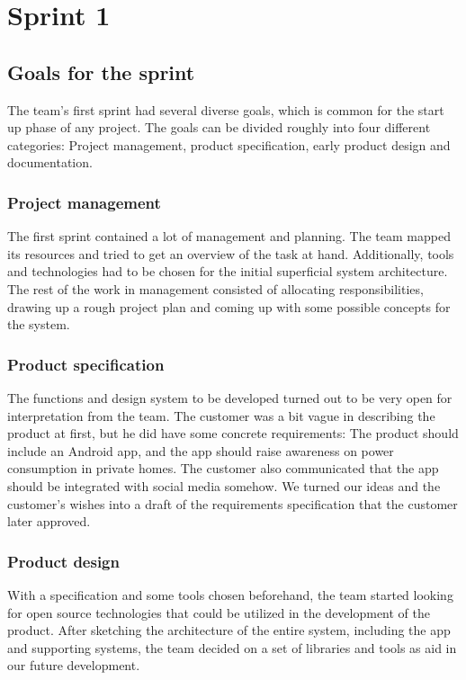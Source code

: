 \section{Sprint 1}

\subsection{Goals for the sprint}
The team's first sprint had several diverse goals, which is common for the start up phase of any project. The goals can be divided roughly into four different categories: Project management, product specification, early product design and documentation.

\subsubsection{Project management}
The first sprint contained a lot of management and planning. The team mapped its resources and tried to get an overview of the task at hand. Additionally, tools and technologies had to be chosen for the initial superficial system architecture. The rest of the work in management consisted of allocating responsibilities, drawing up a rough project plan and coming up with some possible concepts for the system.

\subsubsection{Product specification}
The functions and design system to be developed turned out to be very open for interpretation from the team. The customer was a bit vague in describing the product at first, but he did have some concrete requirements: The product should include an Android app, and the app should raise awareness on power consumption in private homes. The customer also communicated that the app should be integrated with social media somehow. We turned our ideas and the customer's wishes into a draft of the requirements specification that the customer later approved.

\subsubsection{Product design}
With a specification and some tools chosen beforehand, the team started looking for open source technologies that could be utilized in the development of the product. After sketching the architecture of the entire system, including the app and supporting systems, the team decided on a set of libraries and tools as aid in our future development.


